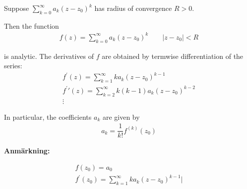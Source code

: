 \begin{theo}[]{}
  Suppose $\sum_{k=0}^{\infty}a_k(z-z_0)^k$ has radius of convergence $R>0$.\par
  \noindent Then the function
  \begin{equation*}
    \begin{gathered}
      f(z) = \sum_{k=0}^{\infty}a_k(z-z_0)^k\qquad\left|z-z_0\right|<R
    \end{gathered}
  \end{equation*}\par
  \noindent is analytic. The derivatives of $f$ are obtained by termwise differentiation of the series:
  \begin{equation*}
    \begin{gathered}
      f^{\prime}(z) = \sum_{k=1}^{\infty}ka_k(z-z_0)^{k-1}\\
      f^{\prime}\prime(z) = \sum_{k=2}^{\infty}k(k-1)a_k(z-z_0)^{k-2}\\
      \vdots
    \end{gathered}
  \end{equation*}
  \par\bigskip
  \noindent In particular, the coefficients $a_k$ are given by
  \begin{equation*}
    \begin{gathered}
      a_k = \dfrac{1}{k!}f^{(k)}(z_0)
    \end{gathered}
  \end{equation*}
\end{theo}
\par\bigskip
\noindent\textbf{Anmärkning:}\par
\begin{equation*}
  \begin{gathered}
    f(z_0) = a_0\\
    f^{\prime}(z_0) = \sum_{k=1}^{\infty}ka_k(z-z_0)^{k-1}\Big|
  \end{gathered}
\end{equation*}
